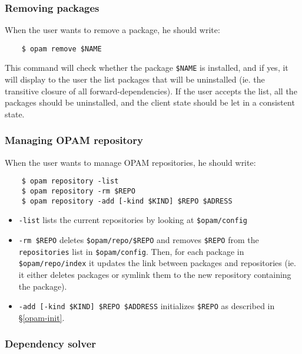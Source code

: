 \documentclass[a4paper,11pt]{article}
\begin{document}
\subsubsection{Removing packages}
\label{opam-remove}

When the user wants to remove a package, he should write:

\begin{verbatim}
    $ opam remove $NAME
\end{verbatim}

This command will check whether the package \verb+$NAME+ is installed,
and if yes, it will display to the user the list packages that will be
uninstalled (ie. the transitive closure of all forward-dependencies).
If the user accepts the list, all the packages should be uninstalled,
and the client state should be let in a consistent state.

\subsubsection{Managing OPAM repository}

When the user wants to manage OPAM repositories, he should write:

\begin{verbatim}
    $ opam repository -list
    $ opam repository -rm $REPO
    $ opam repository -add [-kind $KIND] $REPO $ADRESS
\end{verbatim}

\begin{itemize}
\item \verb+-list+ lists the current repositories by looking at
  \verb+$opam/config+
\item \verb+-rm $REPO+ deletes \verb+$opam/repo/$REPO+ and removes
  \verb+$REPO+ from the {\tt repositories} list in \verb+$opam/config+.
  Then, for each package in \verb+$opam/repo/index+ it updates the link
  between packages and repositories (ie. it either deletes packages or
  symlink them to the new repository containing the package).

\item \verb+-add [-kind $KIND] $REPO $ADDRESS+ initializes
  \verb+$REPO+ as described in \S\ref{opam-init}.

\end{itemize}

\subsubsection{Dependency solver}
\label{deps}
\end{document}
